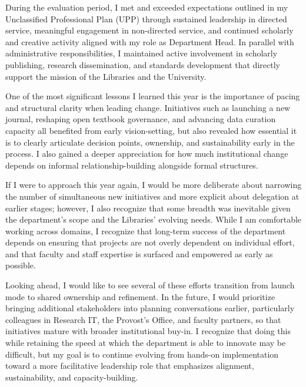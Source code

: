\vspace{\baselineskip}

During the evaluation period, I met and exceeded expectations outlined in my Unclassified Professional Plan (UPP) through sustained leadership in directed service, meaningful engagement in non-directed service, and continued scholarly and creative activity aligned with my role as Department Head. In parallel with administrative responsibilities, I maintained active involvement in scholarly publishing, research dissemination, and standards development that directly support the mission of the Libraries and the University.

\vspace{\baselineskip}

One of the most significant lessons I learned this year is the importance of pacing and structural clarity when leading change. Initiatives such as launching a new journal, reshaping open textbook governance, and advancing data curation capacity all benefited from early vision-setting, but also revealed how essential it is to clearly articulate decision points, ownership, and sustainability early in the process. I also gained a deeper appreciation for how much institutional change depends on informal relationship-building alongside formal structures.

\vspace{\baselineskip}

If I were to approach this year again, I would be more deliberate about narrowing the number of simultaneous new initiatives and more explicit about delegation at earlier stages; however, I also recognize that some breadth was inevitable given the department's scope and the Libraries' evolving needs. While I am comfortable working across domains, I recognize that long-term success of the department depends on ensuring that projects are not overly dependent on individual effort, and that faculty and staff expertise is surfaced and empowered as early as possible.

\vspace{\baselineskip}

Looking ahead, I would like to see several of these efforts transition from launch mode to shared ownership and refinement. In the future, I would prioritize bringing additional stakeholders into planning conversations earlier, particularly colleagues in Research IT, the Provost’s Office, and faculty partners, so that initiatives mature with broader institutional buy-in. I recognize that doing this while retaining the speed at which the department is able to innovate may be difficult, but my goal is to continue evolving from hands-on implementation toward a more facilitative leadership role that emphasizes alignment, sustainability, and capacity-building.

